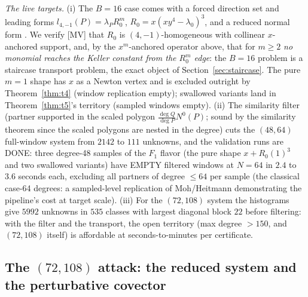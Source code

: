\documentclass[11pt]{article}
\theoremstyle{remark}
\begin{document}
\emph{The live targets.} (i) The $B = 16$ case comes with a forced direction set and
leading forms $l_{4,-1}(P) = \lambda_P R_0^m$, $R_0 = x (x y^4 - \lambda_0)^3$, and a
reduced normal form \cite{GGV2017}. We verify [MV] that $R_0$ is $(4,-1)$-homogeneous with
collinear $x$-anchored support, and, by the $x^m$-anchored operator above, that for
$m \ge 2$ \emph{no monomial reaches the Keller constant from the $R_0^m$ edge}: the
$B = 16$ problem is a staircase transport problem, the exact object of
Section~\ref{sec:staircase}. The pure $m = 1$ shape has $x$ as a Newton vertex and is
excluded outright by Theorem~\ref{thm:t4} (window replication empty); swallowed variants
land in Theorem~\ref{thm:t5}'s territory (sampled windows empty). (ii) The similarity filter
(partner supported in the scaled polygon $\tfrac{\deg Q}{\deg P} N^0(P)$; sound by the
similarity theorem since the scaled polygons are nested in the degree) cuts the
$(48, 64)$ full-window system from $2142$ to $111$ unknowns, and the validation runs are
DONE: three degree-48 samples of the $F_1$ flavor (the pure shape $x + R_0(1)^3$ and two
swallowed variants) have EMPTY filtered windows at $N = 64$ in $2.4$ to $3.6$ seconds
each, excluding all partners of degree $\le 64$ per sample (the classical case-64
degrees: a sampled-level replication of Moh/Heitmann demonstrating the pipeline's cost
at target scale). (iii) For the $(72, 108)$ system the histograms give $5992$ unknowns
in $535$ classes with largest diagonal block $22$ before filtering: with the filter and
the transport, the open territory (max degree $> 150$, and $(72, 108)$ itself) is
affordable at seconds-to-minutes per certificate.

\subsection*{The $(72, 108)$ attack: the reduced system and the perturbative covector}
\end{document}

